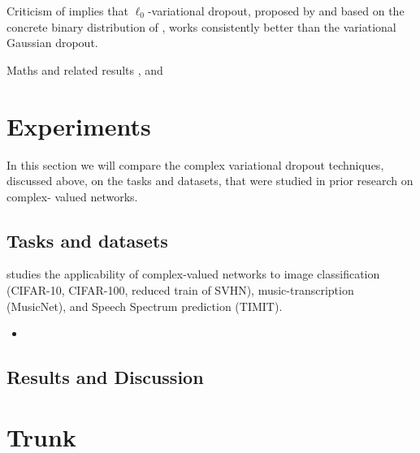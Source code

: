\documentclass[a4paper,10pt]{article}
\begin{document}
Criticism of \cite{gale_state_2019} implies that $\ell_0$-variational dropout,
proposed by \cite{louizos_learning_2017} and based on the concrete binary distribution
of \cite{maddison_concrete_2016}, works consistently better than the variational
Gaussian dropout.

Maths and related results \cite{pav_moments_2015,taubock_complex-valued_2012},
and \cite{karseras_caution:_nodate}


\section{Experiments} %
\label{sec:Experiments}

In this section we will compare the complex variational dropout techniques, discussed
above, on the tasks and datasets, that were studied in prior research on complex-%
valued networks.

\subsection{Tasks and datasets} %
\label{sub:tasks_and_datasets}

\cite{trabelsi_deep_2017} studies the applicability of complex-valued networks to
image classification (CIFAR-10, CIFAR-100, reduced train of SVHN), music-transcription
(MusicNet), and Speech Spectrum prediction (TIMIT).
\begin{itemize}
  \item 
\end{itemize}


\cite{monning_evaluation_2018}
\cite{jankowski_complex-valued_1996}
\cite{amin_complex-valued_nodate}
\cite{sarroff_complex_nodate}


\subsection{Results and Discussion} %
\label{sub:results_and_discussion}



\section{Trunk} %
\label{sec:trunk}
\end{document}
